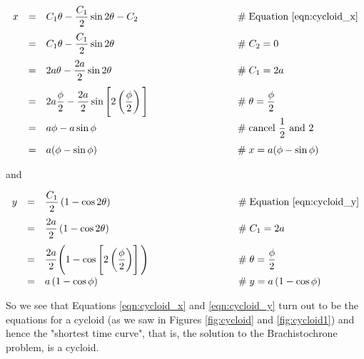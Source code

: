\documentclass{article}
\theoremstyle{definition}
\begin{document}
\bigskip
\begin{equation*}
\begin{array}{lllll}
x 
&=& C_1 \theta -  \dfrac{C_1}{2} \sin 2\theta - C_2
			&\qquad \qquad \qquad \qquad \mathrel{\#} \text{Equation \ref{eqn:cycloid_x}} \\
[10pt]
&=& C_1 \theta -  \dfrac{C_1}{2} \sin 2\theta
			&\qquad \qquad \qquad \qquad \mathrel{\#} C_2 = 0 \\
[10pt]
&=& 2 a \theta -  \dfrac{2 a}{2} \sin 2\theta 									
			&\qquad \qquad \qquad \qquad \mathrel{\#} C_1 = 2a  \\
[10pt]
&=& 2 a \dfrac{\phi}{2} -  \dfrac{2 a}{2} \sin \Bigg [ 2 \left (\dfrac{\phi}{2} \right ) \Bigg ]
			&\qquad \qquad \qquad \qquad \mathrel{\#} \theta = \dfrac{\phi}{2} \\
[10pt]
&=& a \phi -  a \sin \phi 														
			&\qquad \qquad \qquad \qquad \mathrel{\#} \text{cancel $\dfrac{1}{2}$ and $2$} \\
[10pt]
&=& a (\phi -  \sin \phi) 														
			&\qquad \qquad \qquad \qquad \mathrel{\#} x = a (\phi -  \sin \phi) \\
\end{array}
\end{equation*}


\bigskip
\noindent
and

\bigskip
\begin{equation*}
\begin{array}{lllll}
y	
&=& \dfrac{C_1}{2} \left ( 1 - \cos 2 \theta \right )
			&\qquad \qquad \qquad \qquad \mathrel{\#} \text{Equation \ref{eqn:cycloid_y}} \\
[10pt]
&=& \dfrac{2a}{2} \left ( 1 - \cos 2 \theta \right )
			&\qquad \qquad \qquad \qquad \mathrel{\#} C_1 = 2 a \\
[10pt]
&=& \dfrac{2a}{2} \Bigg ( 1 - \cos \left [ 2 \left (\dfrac{\phi}{2} \right ) \right ] \Bigg )
			&\qquad \qquad \qquad \qquad \mathrel{\#} \theta = \dfrac{\phi}{2} \\
[10pt]
&=& a \left ( 1 - \cos \phi \right )
			&\qquad \qquad \qquad \qquad \mathrel{\#} y = a \left (1 - \cos \phi \right)
\end{array}
\end{equation*}


\bigskip
\noindent
So we see that Equations \ref{eqn:cycloid_x} and
\ref{eqn:cycloid_y} turn out to be the equations for a cycloid
(as we saw in Figures \ref{fig:cycloid} and \ref{fig:cycloid1})
and hence the "shortest time curve", that is, the solution to the
Brachistochrone problem, is a cycloid.
\end{document}
